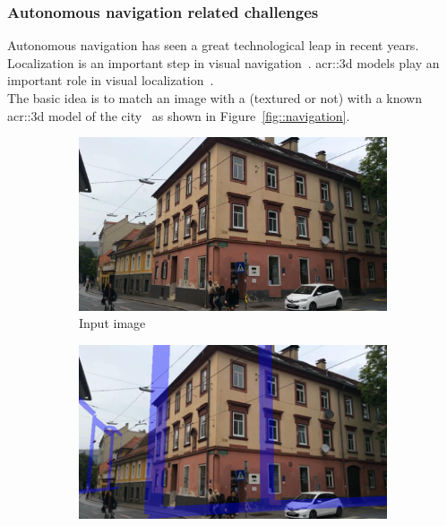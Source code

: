         \subsubsection{Autonomous navigation related challenges}
            Autonomous navigation has seen a great technological leap in recent years.
            Localization is an important step in visual navigation~\parencite{bonin2008visual}.
            \Gls{acr::3d} models play an important role in visual localization~\parencite{piasco2018survey, ijgi4042842}.\\
            The basic idea is to match an image with a (textured or not) with a known \gls{acr::3d} model of the city~\parencite{arth2015instant, ardeshir2014gis, cham2010estimating, christie2016semantics} as shown in Figure~\ref{fig::navigation}.
            \begin{figure}[htpb]
                \begin{subfigure}{.18\textwidth}
                    \begin{center}
                        \includegraphics[width=\textwidth]{images/3d_model_applications/pose_estimation/input_image}
                        \caption{\label{subfig::input_image} Input image}
                    \end{center}
                \end{subfigure}
                \hfill
                \begin{subfigure}{.18\textwidth}
                    \begin{center}
                        \includegraphics[width=\textwidth]{images/3d_model_applications/pose_estimation/init_pose}

\end{center}
\end{subfigure}
\end{figure}
